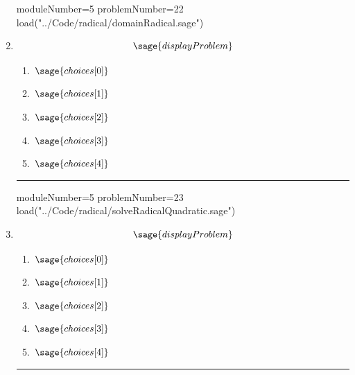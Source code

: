 \documentclass[14pt]{article}
\newcommand{\litem}[1]{\item#1\hspace*{-1cm}\rule{\textwidth}{0.4pt}}
\begin{document}
\begin{enumerate}
{\begin{enumerate}[label=\Alph*.]
\end{enumerate}
}

\begin{sagesilent}
moduleNumber=5
problemNumber=22
load("../Code/radical/domainRadical.sage")
\end{sagesilent}

\litem{ 

	\[ \sage{displayProblem} \]
	\begin{enumerate}[label=\Alph*.]
		\item \( \sage{choices[0]} \)
		\item \( \sage{choices[1]} \)
		\item \( \sage{choices[2]} \)
		\item \( \sage{choices[3]} \)
		\item \( \sage{choices[4]} \)
	\end{enumerate}
}

\begin{sagesilent}
moduleNumber=5
problemNumber=23
load("../Code/radical/solveRadicalQuadratic.sage")
\end{sagesilent}

\litem{

\[ \sage{displayProblem} \]

	\begin{enumerate}[label=\Alph*.]
		\item \( \sage{choices[0]} \)
		\item \( \sage{choices[1]} \)
		\item \( \sage{choices[2]} \)
		\item \( \sage{choices[3]} \)
		\item \( \sage{choices[4]} \)
	\end{enumerate}
}


\end{enumerate}
\end{document}
